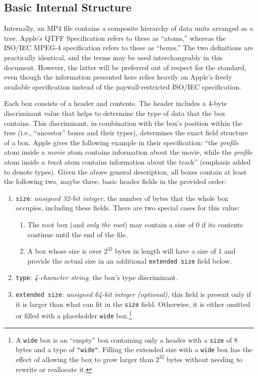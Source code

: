 \subsection{Basic Internal Structure}

Internally, an MP4 file contains a composite hierarchy of data units arranged as a tree. Apple's QTFF Specification \cite{apple2016} refers to these as ``atoms,'' whereas the ISO/IEC MPEG-4 specification refers to these as ``boxes.'' The two definitions are practically identical, and the terms may be used interchangeably in this document. However, the latter will be preferred out of respect for the standard, even though the information presented here relies heavily on Apple's freely available specification instead of the paywall-restricted ISO/IEC specification.

Each box consists of a header and contents. The header includes a 4-byte discriminant value that helps to determine the type of data that the box contains. This discriminant, in combination with the box's position within the tree (i.e., ``ancestor'' boxes and their types), determines the exact field structure of a box. Apple gives the following example in their specification: ``the \emph{profile} atom inside a \emph{movie} atom contains information about the movie, while the \emph{profile} atom inside a \emph{track} atom contains information about the track'' (emphasis added to denote types). Given the above general description, all boxes contain at least the following two, maybe three, basic header fields in the provided order:

\begin{enumerate}
	\item \texttt{size}: \emph{unsigned 32-bit integer}, the number of bytes that the whole box occupies, including these fields. There are two special cases for this value:
		\begin{enumerate}
			\item The root box (and \emph{only the root}) may contain a size of 0 if its contents continue until the end of the file.
			\item A box whose size is over \( 2^{32} \) bytes in length will have a size of 1 and provide the actual size in an additional \texttt{extended size} field below.
		\end{enumerate}
	\item \texttt{type}: \emph{4-character string}, the box's type discriminant.
	\item \texttt{extended size}: \emph{unsigned 64-bit integer (optional)}, this field is present only if it is larger than what can fit in the \texttt{size} field. Otherwise, it is either omitted or filled with a placeholder \texttt{wide} box.\footnote{A \texttt{wide} box is an ``empty'' box containing only a header with a \texttt{size} of 8 bytes and a type of \texttt{"wide"}. Filling the extended size with a \texttt{wide} box has the effect of allowing the box to grow larger than \( 2^{32} \) bytes without needing to rewrite or reallocate it.}
\end{enumerate}

